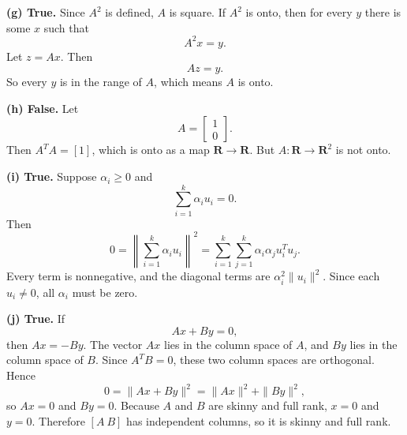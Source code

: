 \textbf{(g) True.}
Since \(A^2\) is defined, \(A\) is square. If \(A^2\) is onto, then for
every \(y\) there is some \(x\) such that
\[
    A^2x = y.
\]
Let \(z=Ax\). Then
\[
    Az = y.
\]
So every \(y\) is in the range of \(A\), which means \(A\) is onto.

\textbf{(h) False.}
Let
\[
    A =
    \begin{bmatrix}
        1\\0
    \end{bmatrix}.
\]
Then \(A^T A = [1]\), which is onto as a map \(\mathbf{R}\to\mathbf{R}\).
But \(A:\mathbf{R}\to\mathbf{R}^2\) is not onto.

\textbf{(i) True.}
Suppose \(\alpha_i\geq 0\) and
\[
    \sum_{i=1}^k \alpha_i u_i=0.
\]
Then
\[
    0 =
    \left\|\sum_{i=1}^k \alpha_i u_i\right\|^2
    =
    \sum_{i=1}^k\sum_{j=1}^k
    \alpha_i\alpha_j u_i^T u_j.
\]
Every term is nonnegative, and the diagonal terms are
\(\alpha_i^2\|u_i\|^2\). Since each \(u_i\neq 0\), all \(\alpha_i\) must
be zero.

\textbf{(j) True.}
If
\[
    Ax+By=0,
\]
then \(Ax=-By\). The vector \(Ax\) lies in the column space of \(A\), and
\(By\) lies in the column space of \(B\). Since \(A^T B=0\), these two
column spaces are orthogonal. Hence
\[
    0=\|Ax+By\|^2=\|Ax\|^2+\|By\|^2,
\]
so \(Ax=0\) and \(By=0\). Because \(A\) and \(B\) are skinny and full
rank, \(x=0\) and \(y=0\). Therefore \([A\ B]\) has independent columns,
so it is skinny and full rank.
